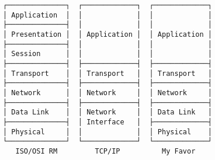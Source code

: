 \documentclass[varwidth,crop]{standalone}
\begin{document}
\begin{verbatim}
┌──────────────┐  ┌─────────────┐  ┌─────────────┐
│ Application  │  │             │  │             │
├──────────────┤  │             │  │             │
│ Presentation │  │ Application │  │ Application │
├──────────────┤  │             │  │             │
│ Session      │  │             │  │             │
├──────────────┤  ├─────────────┤  ├─────────────┤
│ Transport    │  │ Transport   │  │ Transport   │
├──────────────┤  ├─────────────┤  ├─────────────┤
│ Network      │  │ Network     │  │ Network     │
├──────────────┤  ├─────────────┤  ├─────────────┤
│ Data Link    │  │ Network     │  │ Data Link   │
├──────────────┤  │ Interface   │  ├─────────────┤
│ Physical     │  │             │  │ Physical    │
└──────────────┘  └─────────────┘  └─────────────┘
   ISO/OSI RM         TCP/IP          My Favor
\end{verbatim}
\end{document}

